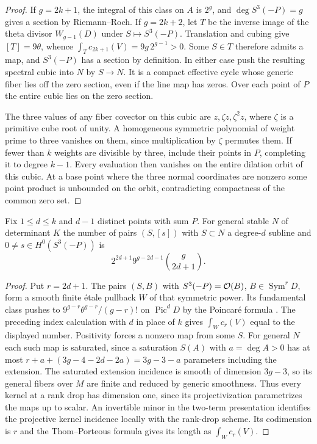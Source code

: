 \begin{proof}
If $g=2k+1$, the integral of this class on $A$ is $2^g$, and
$\deg S^3(-P)=g$ gives a section by Riemann--Roch. If $g=2k+2$, let
$T$ be the inverse image of the theta divisor $W_{g-1}(D)$ under
$S\mapsto S^3(-P)$. Translation and cubing give $[T]=9\theta$, whence
$\int_T c_{2k+1}(V)=9g\,2^{g-1}>0$. Some $S\in T$ therefore admits
a map, and $S^3(-P)$ has a section by definition. In either case push
the resulting spectral cubic into $N$ by $S\to N$. It is a compact
effective cycle whose generic fiber lies off the zero section, even if the line map has
zeros. Over each point of $P$ the entire cubic lies on the zero section.

The three values of any fiber covector on this cubic are
$z,\zeta z,\zeta^2z$, where $\zeta$ is a primitive cube root of unity.
A homogeneous symmetric polynomial of weight prime to three
vanishes on them, since multiplication by $\zeta$ permutes them. If
fewer than $k$ weights are divisible by three, include their points in
$P$, completing it to degree $k-1$. Every evaluation then vanishes on
the entire dilation orbit of this cubic. At a base point where the three normal coordinates are nonzero
some point product is unbounded on the orbit, contradicting compactness
of the common zero set.
\end{proof}

\begin{corollary}\label{cor:cubic-fiber-count}
Fix $1\leq d\leq k$ and $d-1$ distinct points with sum $P$. For general
stable $N$ of determinant $K$ the number of pairs $(S,[s])$ with
$S\subset N$ a degree-$d$ subline and $0\ne s\in H^0(S^3(-P))$ is
\[
        2^{2d+1}9^{g-2d-1}\binom{g}{2d+1}.
\]
\end{corollary}

\begin{proof}
Put $r=2d+1$. The pairs $(S,B)$ with $S^3(-P)=\mathcal O(B)$,
$B\in\operatorname{Sym}^rD$, form a smooth finite \'etale pullback $W$
of that symmetric power. Its fundamental class pushes to
$9^{g-r}\theta^{g-r}/(g-r)!$ on $\operatorname{Pic}^dD$ by the
Poincar\'e formula \cite[Introduction]{Debarre}. The preceding index
calculation with $d$ in place of $k$ gives $\int_W c_r(V)$ equal to the
displayed number. Positivity forces a nonzero map from some $S$.
For general $N$ each such map is saturated, since a saturation $S(A)$
with $a=\deg A>0$ has at most $r+a+(3g-4-2d-2a)=3g-3-a$ parameters
including the extension. The saturated extension incidence is smooth
of dimension $3g-3$, so its general fibers over $M$ are finite and
reduced by generic smoothness. Thus every kernel at a rank drop has
dimension one, since its projectivization parametrizes the maps up to
scalar. An invertible minor in the two-term presentation identifies
the projective kernel incidence locally with the rank-drop scheme.
Its codimension is $r$ and the Thom--Porteous formula gives its length
as $\int_W c_r(V)$.
\end{proof}

